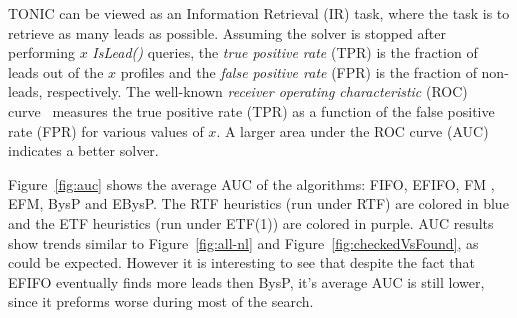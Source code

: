 \documentclass[journal]{IEEEtran}
\newcommand{\islead}[1]{{\em IsLead(#1)}}
\begin{document}
TONIC can be viewed as an Information Retrieval (IR) task, where the task is to retrieve as many leads as possible. %
Assuming the solver is stopped after performing $x$ \islead{} queries, the {\em true positive rate} (TPR) is the fraction of leads out of the \(x\) profiles and the {\em false positive rate} (FPR) is the fraction of non-leads, respectively. 
The well-known {\em receiver operating characteristic} (ROC) curve~\cite{croft2010search} measures the true positive rate (TPR) as a function of the false positive rate (FPR) for various values of \(x\). A larger area under the ROC curve (AUC) indicates a better solver. 

Figure~\ref{fig:auc} shows the average AUC of the algorithms: FIFO, EFIFO, FM , EFM, BysP and EBysP. The RTF heuristics (run under RTF)  are colored in blue and the ETF heuristics (run under ETF(1)) are colored in purple. AUC results show trends similar to Figure~\ref{fig:all-nl} and Figure~\ref{fig:checkedVsFound}, as could be expected. However it is interesting to see that despite the fact that EFIFO eventually finds more leads then BysP, it's average AUC is still lower, since it preforms worse during most of the search.



\end{document}
